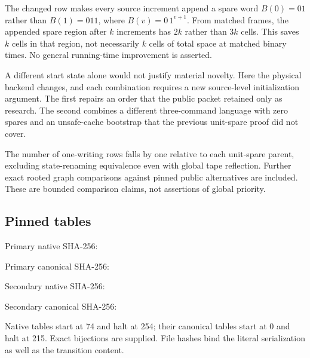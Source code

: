 The changed row makes every source increment append a spare word
$B(0)=01$ rather than $B(1)=011$, where $B(v)=0\,1^{v+1}$. From matched frames, the appended spare region after $k$ increments has $2k$ rather than $3k$ cells. This saves $k$ cells in that region, not necessarily $k$ cells of total space at matched binary times. No general running-time improvement is asserted.

A different start state alone would not justify material novelty. Here the physical backend changes, and each combination requires a new source-level initialization argument. The first repairs an order that the public packet retained only as research. The second combines a different three-command language with zero spares and an unsafe-cache bootstrap that the previous unit-spare proof did not cover.

The number of one-writing rows falls by one relative to each unit-spare parent, excluding state-renaming equivalence even with global tape reflection. Further exact rooted graph comparisons against pinned public alternatives are included. These are bounded comparison claims, not assertions of global priority.

\subsection{Pinned tables}
\noindent\begin{minipage}{\linewidth}Primary native SHA-256:
\begin{quote}\small{}\end{quote}\end{minipage}\par
\noindent\begin{minipage}{\linewidth}Primary canonical SHA-256:
\begin{quote}\small{}\end{quote}\end{minipage}\par
\noindent\begin{minipage}{\linewidth}Secondary native SHA-256:
\begin{quote}\small{}\end{quote}\end{minipage}\par
\noindent\begin{minipage}{\linewidth}Secondary canonical SHA-256:
\begin{quote}\small{}\end{quote}\end{minipage}\par
Native tables start at 74 and halt at 254; their canonical tables start at 0 and halt at 215. Exact bijections are supplied. File hashes bind the literal serialization as well as the transition content.

